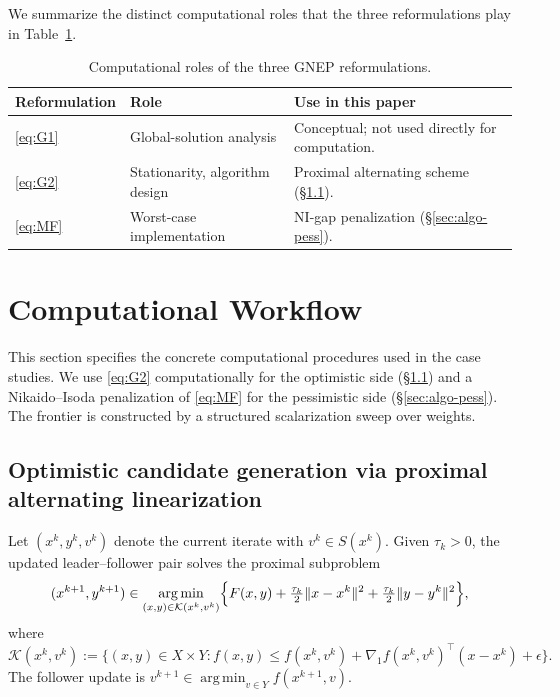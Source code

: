 \documentclass[11pt]{article}
\theoremstyle{definition}
\newcommand{\eps}{\epsilon}
\DeclareMathOperator*{\argmin}{arg\,min}
\begin{document}
We summarize the distinct computational roles that the three reformulations play in Table~\ref{tab:reform-roles}.

\begin{table}[ht]
\centering
\caption{Computational roles of the three GNEP reformulations.}
\label{tab:reform-roles}
\small
\begin{tabular}{@{}lll@{}}
\toprule
Reformulation & Role & Use in this paper\\
\midrule
\eqref{eq:G1} & Global-solution analysis &
Conceptual; not used directly for computation.\\
\eqref{eq:G2} & Stationarity, algorithm design &
Proximal alternating scheme (\S\ref{sec:algo-opt}).\\
\eqref{eq:MF} & Worst-case implementation &
NI-gap penalization (\S\ref{sec:algo-pess}).\\
\bottomrule
\end{tabular}
\end{table}

\section{Computational Workflow}\label{sec:algo}

This section specifies the concrete computational procedures used
in the case studies. We use \eqref{eq:G2} computationally for the
optimistic side (\S\ref{sec:algo-opt}) and a Nikaido--Isoda
penalization of \eqref{eq:MF} for the pessimistic side
(\S\ref{sec:algo-pess}). The frontier is constructed by a
structured scalarization sweep over weights.

\subsection{Optimistic candidate generation via proximal alternating
linearization}
\label{sec:algo-opt}
Let $(x^k,y^k,v^k)$ denote the current iterate with
$v^k\in S(x^k)$. Given $\tau_k>0$, the updated leader--follower
pair solves the proximal subproblem
\begin{equation}\label{eq:prox-sub}
  (x^{k+1},y^{k+1})
  \in\argmin_{(x,y)\in\mathcal K(x^k,v^k)}
  \Bigl\{F(x,y)+\tfrac{\tau_k}{2}\|x-x^k\|^2
  +\tfrac{\tau_k}{2}\|y-y^k\|^2\Bigr\},
\end{equation}
where
\begin{equation}\label{eq:Kk}
  \mathcal K(x^k,v^k):=\{(x,y)\in X\times Y:
  f(x,y)\le f(x^k,v^k)+\nabla_1 f(x^k,v^k)^\top(x-x^k)+\eps\}.
\end{equation}
The follower update is
$v^{k+1}\in\argmin_{v\in Y}f(x^{k+1},v)$. 
\end{document}

